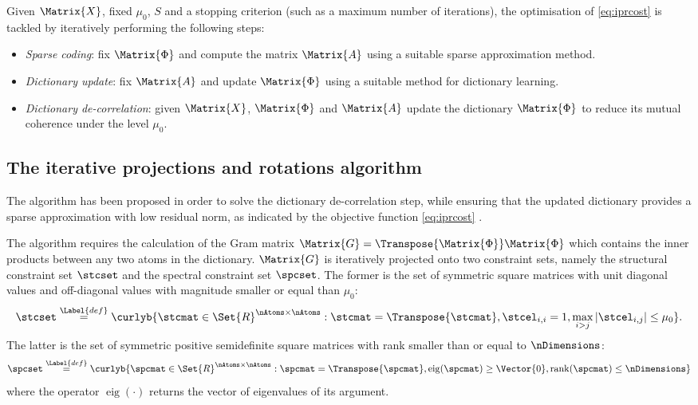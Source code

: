 \documentclass{article}
\def \Feas{\Matrix{X}} 	%
\def \Dic{\Matrix{\Phi}} %
\def \Coeff{\Matrix{A}} 	%
\def \coherence{\mu} 		%
\def \nActiveAtoms{S} 	%
\def \definition{\overset{\Label{def}}{=}}	%
\def \Gram{\Matrix{G}} 						%
\def \ambient{\Set{R}} 						%
\begin{document}
Given $\Feas$, fixed $\coherence_{0}$, $\nActiveAtoms$ and a stopping criterion (such as a maximum number of iterations), the optimisation of \eqref{eq:iprcost} is tackled by iteratively performing the following steps:
\begin{itemize}
	\item\emph{Sparse coding}: fix $\Dic$ and compute the matrix $\Coeff$ using a suitable sparse approximation method.
	\item\emph{Dictionary update}: fix $\Coeff$ and update $\Dic$ using a suitable method for dictionary learning.
	\item\emph{Dictionary de-correlation}: given $\Feas$, $\Dic$ and $\Coeff$ update the dictionary $\Dic$ to reduce its mutual coherence under the level $\coherence_{0}$.
\end{itemize}

\subsection{The iterative projections and rotations algorithm}\label{sec:ipr}
The  algorithm has been proposed in order to solve the dictionary de-correlation step, while ensuring that the updated dictionary provides a sparse approximation with low residual norm, as indicated by the objective function \eqref{eq:iprcost} \cite{Barchiesi2013Le}.

The  algorithm requires the calculation of the Gram matrix $\Gram=\Transpose{\Dic}\Dic$ which contains the inner products between any two atoms in the dictionary. $\Gram$ is iteratively projected onto two constraint sets, namely the structural constraint set $\stcset$ and the spectral constraint set $\spcset$. The former is the set of symmetric square matrices with unit diagonal values and off-diagonal values with magnitude smaller or equal than $\coherence_{0}$:
\small
\begin{equation*}
	\stcset \definition \curlyb{\stcmat \in \ambient^{\nAtoms \times \nAtoms} : \stcmat = \Transpose{\stcmat}, \stcel_{i,i}=1,\max_{i > j}|\stcel_{i,j}|\leq \coherence_{0}}.
\end{equation*}
\normalsize
The latter is the set of symmetric positive semidefinite square matrices with rank smaller than or equal to $\nDimensions$:
\begin{equation*}
\spcset \definition \curlyb{ \spcmat \in \ambient^{\nAtoms \times \nAtoms} : \spcmat = \Transpose{\spcmat}, \operatorname{eig}(\spcmat)\geq \Vector{0}, \operatorname{rank}(\spcmat)\leq \nDimensions}
\end{equation*}  
where the operator $\operatorname{eig}(\cdot)$ returns the vector of eigenvalues of its argument.
\end{document}

